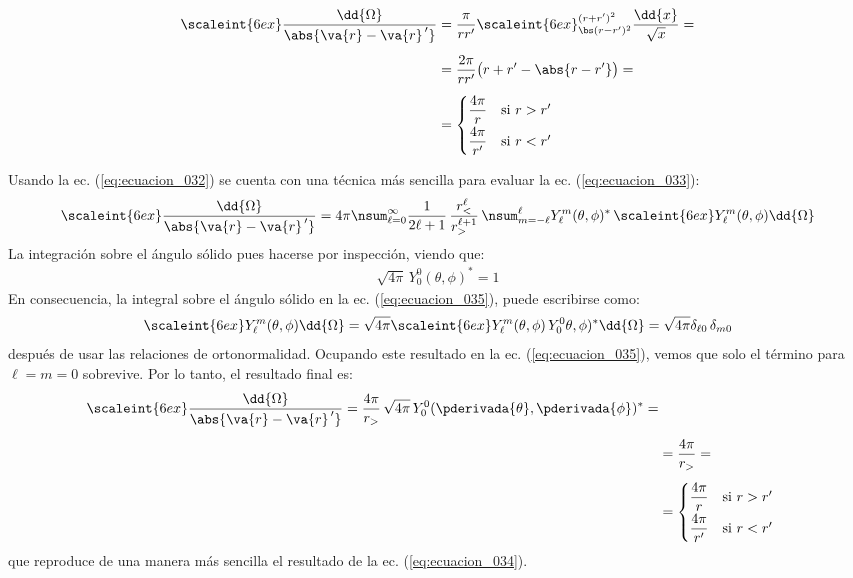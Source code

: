 \begin{align}
\begin{aligned}[b]
\scaleint{6ex} \dfrac{\dd{\Omega}}{\abs{\va{r} - \va{r}^{\, \prime}}} &= \dfrac{\pi}{r r^{\prime}} \scaleint{6ex}_{\bs (r - r^{\prime})^{2}}^{(r + r^{\prime})^{2}} \dfrac{\dd{x}}{\sqrt{x}} = \\[0.5em]
&= \dfrac{2 \pi}{r r^{\prime}} \big( r + r^{\prime} - \abs{r - r^{\prime}} \big) = \\[0.5em]
&= \begin{cases}
\dfrac{4 \pi}{r} & \mbox{si } r > r^{\prime} \\[0.5em]
\dfrac{4 \pi}{r^{\prime}} & \mbox{si } r < r^{\prime}
\end{cases}
\end{aligned}
\label{eq:ecuacion_034}
\end{align}

Usando la ec. (\ref{eq:ecuacion_032}) se cuenta con una técnica más sencilla para evaluar la ec. (\ref{eq:ecuacion_033}):
\begin{align}
\scaleint{6ex} \dfrac{\dd{\Omega}}{\abs{\va{r} - \va{r}^{\, \prime}}} = 4 \pi \nsum_{\ell=0}^{\infty} \dfrac{1}{2 \ell + 1} \, \dfrac{r_{<}^{\ell}}{r_{>}^{\ell+1}} \, \nsum_{m=-\ell}^{\ell} Y_{\ell}^{m} (\theta, \phi)^{*} \, \scaleint{6ex} Y_{\ell}^{m} (\theta, \phi) \dd{\Omega}
\label{eq:ecuacion_035}
\end{align}
La integración sobre el ángulo sólido pues hacerse por inspección, viendo que:
\begin{align}
\sqrt{4 \pi} \, Y_{0}^{0} (\theta, \phi)^{*} = 1
\end{align}
En consecuencia, la integral sobre el ángulo sólido en la ec. (\ref{eq:ecuacion_035}), puede escribirse como:
\begin{align*}
\scaleint{6ex} Y_{\ell}^{m} (\theta, \phi) \dd{\Omega} = \sqrt{4 \pi} \scaleint{6ex} Y_{\ell}^{m} (\theta, \phi) \, Y_{0}^{0} \theta, \phi)^{*} \dd{\Omega} = \sqrt{4 \pi} \delta_{\ell 0} \, \delta_{m 0}
\end{align*}
después de usar las relaciones de ortonormalidad. Ocupando este resultado en la ec. (\ref{eq:ecuacion_035}), vemos que solo el término para $\ell = m = 0$ sobrevive. Por lo tanto, el resultado final es:
\begin{align}
\begin{aligned}
\scaleint{6ex} \dfrac{\dd{\Omega}}{\abs{\va{r} - \va{r}^{\, \prime}}} = \dfrac{4 \pi}{r_{>}} \, \sqrt{4 \pi} \, Y_{0}^{0} (\pderivada{\theta}, \pderivada{\phi})^{*} = \\[0.5em]
&= \dfrac{4 \pi}{r_{>}} = \\[0.5em]
&= \begin{cases}
\dfrac{4 \pi}{r} & \mbox{si } r > r^{\prime} \\[0.5em]
\dfrac{4 \pi}{r^{\prime}} & \mbox{si } r < r^{\prime}
\end{cases}
\end{aligned}
\end{align}
que reproduce de una manera más sencilla el resultado de la ec. (\ref{eq:ecuacion_034}).

